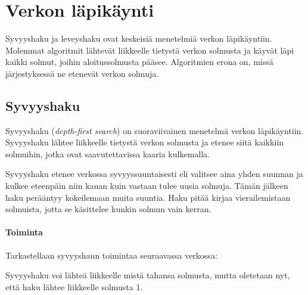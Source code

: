 \chapter{Verkon läpikäynti}

Syvyyshaku ja leveyshaku ovat keskeisiä
menetelmiä verkon läpikäyntiin.
Molemmat algoritmit lähtevät liikkeelle
tietystä verkon solmusta ja 
käyvät läpi kaikki solmut,
joihin aloitussolmusta pääsee.
Algoritmien erona on,
missä järjestyksessä ne etenevät verkon solmuja.

\section{Syvyyshaku}

Syvyyshaku (\textit{depth-first search})
on suoraviivainen menetelmä verkon läpikäyntiin.
Syvyyshaku lähtee liikkeelle tietystä
verkon solmusta ja etenee siitä
kaikkiin solmuihin, jotka ovat
saavutettavissa kaaria kulkemalla.

Syvyyshaku etenee verkossa syvyyssuuntaisesti
eli valitsee aina yhden suunnan
ja kulkee eteenpäin niin kauan
kuin vastaan tulee uusia solmuja.
Tämän jälkeen haku perääntyy kokeilemaan
muita suuntia.
Haku pitää kirjaa vierailemistaan solmuista,
jotta se käsittelee kunkin solmun vain kerran.

\subsubsection*{Toiminta}

Tarkastellaan syvyyshaun toimintaa
seuraavassa verkossa:
\begin{center}
\end{center}
Syvyyshaku voi lähteä liikkeelle
mistä tahansa solmusta,
mutta oletetaan nyt,
että haku lähtee liikkeelle solmusta 1.

